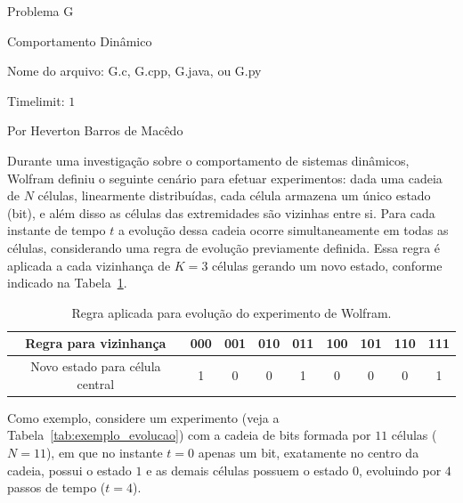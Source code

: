 \begin{center}
Problema G

Comportamento Dinâmico

{\small Nome do arquivo: G.c, G.cpp, G.java, ou G.py}

{\large Timelimit: $1$}

{\tiny Por Heverton Barros de Macêdo}

\end{center}

\footnotesize

	Durante uma investigação sobre o comportamento de sistemas dinâmicos, Wolfram definiu o seguinte cenário para efetuar experimentos: dada uma cadeia de $N$ células, linearmente distribuídas, cada célula armazena um único estado (bit), e além disso as células das extremidades são vizinhas entre si. Para cada instante de tempo $t$ a evolução dessa cadeia ocorre simultaneamente em todas as células, considerando uma regra de evolução previamente definida. Essa regra é aplicada a cada vizinhança de $K=3$ células gerando um novo estado, conforme indicado na Tabela~\ref{tab:evolucao}.
	
	\begin{table}[h!]
		\caption{Regra aplicada para evolução do experimento de Wolfram.}
		\label{tab:evolucao}
		
		\centering
		\footnotesize{
		\begin{tabular}{|c|c|c|c|c|c|c|c|c|}
			\hline
			\cellcolor[HTML]{DDDDDD} Regra para vizinhança & 000 & 001 & \cellcolor[HTML]{FFAAAA} 010 & 011 & 100 & 101 & 110 & 111 \\ \hline
			\cellcolor[HTML]{DDDDDD} Novo estado para célula central & 1 & 0 &  \cellcolor[HTML]{AAFFAA} 0 & 1 & 0 & 0 & 0 & 1 \\ \hline
		\end{tabular}
		}
	\end{table}

Como exemplo, considere um experimento (veja a Tabela~\ref{tab:exemplo_evolucao}) com a cadeia de bits formada por $11$ células ($N = 11$), em que no instante $t = 0$ apenas um bit, exatamente no centro da cadeia, possui o estado $1$ e as demais células possuem o estado $0$, evoluindo por $4$ passos de tempo ($t = 4$).

